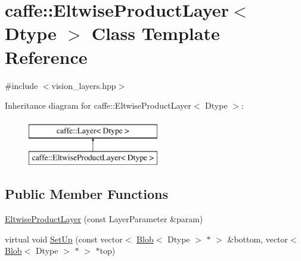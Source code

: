 \hypertarget{classcaffe_1_1_eltwise_product_layer}{\section{caffe\+:\+:Eltwise\+Product\+Layer$<$ Dtype $>$ Class Template Reference}
\label{classcaffe_1_1_eltwise_product_layer}
}


{\ttfamily \#include $<$vision\+\_\+layers.\+hpp$>$}

Inheritance diagram for caffe\+:\+:Eltwise\+Product\+Layer$<$ Dtype $>$\+:\begin{figure}[H]
\begin{center}
\leavevmode
\includegraphics[height=2.000000cm]{classcaffe_1_1_eltwise_product_layer}
\end{center}
\end{figure}
\subsection*{Public Member Functions}
\begin{DoxyCompactItemize}
\item 
\hyperlink{classcaffe_1_1_eltwise_product_layer_ae8ba2b765a0b666927448e5746733044}{Eltwise\+Product\+Layer} (const Layer\+Parameter \&param)
\item 
virtual void \hyperlink{classcaffe_1_1_eltwise_product_layer_ab24fdd7f4a2b47c95fbe80ed1cd5ee08}{Set\+Up} (const vector$<$ \hyperlink{classcaffe_1_1_blob}{Blob}$<$ Dtype $>$ $\ast$ $>$ \&bottom, vector$<$ \hyperlink{classcaffe_1_1_blob}{Blob}$<$ Dtype $>$ $\ast$ $>$ $\ast$top)
\end{DoxyCompactItemize}
